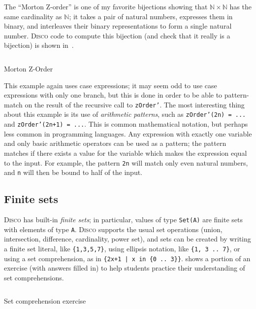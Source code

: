 \documentclass[submission,copyright,creativecommons]{eptcs}
\newcommand{\disco}{\textsc{Disco}\xspace}
\newcommand{\pref}[1]{\prettyref{#1}}
\newcommand{\N}{\mathbb{N}}
\begin{document}
The ``Morton Z-order'' is one of my favorite bijections showing that
$\N \times \N$ has the same cardinality as $\N$; it takes a pair of
natural numbers, expresses them in binary, and interleaves their
binary representations to form a single natural number.  \disco code
to compute this bijection (and check that it really is a bijection) is
shown in~\pref{lst:zorder}.

\begin{listing}[!htp]
\inputminted{text}{examples/zorder.disco}
\caption{Morton Z-Order}
\label{lst:zorder}
\end{listing}

This example again uses case expressions; it may seem odd to use case
expressions with only one branch, but this is done in order to be able
to pattern-match on the result of the recursive call to
\texttt{zOrder'}.  The most interesting thing about this
example is its use of \emph{arithmetic patterns}, such as %
\texttt{zOrder'(2n) = ...} and
\texttt{zOrder'(2n+1) = ...}.  This is common mathematical
notation, but perhaps less common in programming languages.  Any
expression with exactly one variable and only basic arithmetic
operators can be used as a pattern; the pattern matches if there
exists a value for the variable which makes the expression equal to
the input.  For example, the pattern \texttt{2n} will match only even
natural numbers, and \texttt{n} will then be bound to half of the
input.

\subsection{Finite sets}

\disco has built-in \emph{finite sets}; in particular, values of type
\texttt{Set(A)} are finite sets with elements of type
\texttt{A}. \disco supports the usual set operations (union,
intersection, difference, cardinality, power set), and sets can be created by
writing a finite set literal, like \verb|{1,3,5,7}|, using ellipsis
notation, like \verb|{1, 3 .. 7}|, or using a set comprehension, as in
\verb-{2x+1 | x in {0 .. 3}}-. \pref{lst:sets} shows a portion
of an exercise (with answers filled in) to help students practice
their understanding of set comprehensions.

\begin{listing}[!htp]
\inputminted{text}{examples/sets.disco}
\caption{Set comprehension exercise}
\label{lst:sets}
\end{listing}
\end{document}
